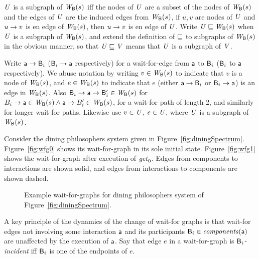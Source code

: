 \begin{definition} \label{defn:wsubgraph}
$\mathit{U}$ is a subgraph of $\mathit{W}_{\mathsf{B}}({s})$ iff the nodes of $\mathit{U}$ are a subset of the nodes of $\mathit{W}_{\mathsf{B}}({s})$ and the edges of $\mathit{U}$ are the induced edges from 
$\mathit{W}_{\mathsf{B}}({s})$, \ie if $u,v$ are nodes of $\mathit{U}$ and $u \rightarrow v$ is en edge of $\mathit{W}_{\mathsf{B}}({s})$, then $u \rightarrow v$ is en edge of $\mathit{U}$.
Write $\mathit{U} \sqsubseteq \mathit{W}_{\mathsf{B}}({s})$ when $\mathit{U}$ is a subgraph of $\mathit{W}_{\mathsf{B}}({s})$, and extend the definition of $\sqsubseteq$ to subgraphs of $\mathit{W}_{\mathsf{B}}({s})$ in the obvious
manner, so that $\mathit{U} \sqsubseteq \mathit{V}$ means that $\mathit{U}$ is a subgraph of $\mathit{V}$.
\end{definition}

Write $\mathsf{a} \rightarrow \mathsf{B}_i$ ($\mathsf{B}_i \rightarrow \mathsf{a}$ respectively) for a
wait-for-edge from $\mathsf{a}$ to $\mathsf{B}_i$ ($\mathsf{B}_i$ to $\mathsf{a}$ respectively).  We abuse notation by writing
$v \in \mathit{W}_{\mathsf{B}}({s})$ to indicate that $v$ is a node of $\mathit{W}_{\mathsf{B}}({s})$, and 
$e \in \mathit{W}_{\mathsf{B}}({s})$ to indicate that $e$ (either $\mathsf{a} \rightarrow \mathsf{B}_i$ or $\mathsf{B}_i \rightarrow \mathsf{a}$) is an edge in
$\mathit{W}_{\mathsf{B}}({s})$. 
Also $\mathsf{B}_i \rightarrow \mathsf{a} \rightarrow \mathsf{B}'_i \in \mathit{W}_{\mathsf{B}}({s})$ for
$B_i \rightarrow \mathsf{a} \in \mathit{W}_{\mathsf{B}}({s}) \land \mathsf{a} \rightarrow B'_i \in \mathit{W}_{\mathsf{B}}({s})$, \ie for a wait-for path of
length 2, and similarly for longer wait-for paths.
Likewise use $v \in \mathit{U}$, $e \in \mathit{U}$, where $\mathit{U}$ is a subgraph of $\mathit{W}_{\mathsf{B}}({s})$.



Consider the dining philosophers system given in Figure~\ref{fig:diningSpectrum}.
Figure~\ref{fig:wfg0} shows its wait-for-graph in its sole initial state.  Figure~\ref{fig:wfg1}
shows the wait-for-graph after execution of $\mathit{get}_0$.  Edges from components to interactions are
shown solid, and edges from interactions to components are shown dashed.

\begin{figure*}[ht]
  \begin{center}
       \quad
      \caption{Example wait-for-graphs for dining philosophers system of Figure~\ref{fig:diningSpectrum}.}
       \label{fig:wfg}
  \end{center}
\end{figure*}





A key principle of the dynamics of the change of wait-for graphs is that 
wait-for edges not involving some interaction
$\mathsf{a}$ and its participants $\mathsf{B}_i \in \mathit{components}(\mathsf{a})$ are unaffected by the execution
of $\mathsf{a}$.  Say that edge $e$ in a wait-for-graph
is \emph{$\mathsf{B}_i$-incident} iff $\mathsf{B}_i$ is one of the endpoints of $e$.


